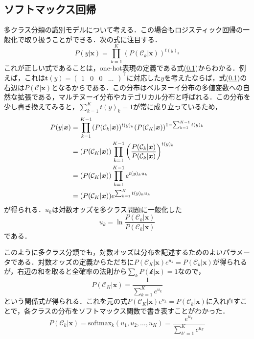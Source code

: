 \documentclass[a4paper,11pt]{jsreport}
\begin{document}
\subsection{ソフトマックス回帰}
多クラス分類の識別モデルについて考える．この場合もロジスティック回帰の一般化で取り扱うことができる．次の式に注目する．
\begin{equation}
  P(y | \bm{x}) 
  = \prod_{k=1}^{K} (P(\mathcal{C}_k | \bm{x}))^{t(y)_k}
\end{equation}
これが正しい式であることは，one-hot表現の定義である式(\ref{})からわかる．例えば，これは$\bm{t}(y) = \begin{pmatrix} 1 & 0 & 0 & \dots \end{pmatrix}^{\top}$に対応した$y$を考えたならば，式(\ref{})の右辺は$P(\mathcal{C} | \bm{x})$となるからである．この分布はベルヌーイ分布の多値変数への自然な拡張である，マルチヌーイ分布やカテゴリカル分布と呼ばれる．この分布を少し書き換えてみると，$\sum_{k=1}^{K} t(y)_k = 1$が常に成り立っているため，
\begin{align}
  P(y | \bm{x}) 
  &= \prod_{k=1}^{K-1} (P(\mathcal{C}_k | \bm{x}))^{t(y)_k} (P(\mathcal{C}_K | \bm{x}))^{1 - \sum_{k=1}^{K-1} t(y)_k} \notag \\
  &= (P(\mathcal{C}_K | \bm{x})) \prod_{k=1}^{K-1} \left( \frac{P(\mathcal{C}_k | \bm{x})}{P(\mathcal{C}_k | \bm{x})} \right)^{t(y)_k} \notag \\
  &= (P(\mathcal{C}_K | \bm{x})) \prod_{k=1}^{K-1} e^{t(y)_k u_k} \notag \\
  &= (P(\mathcal{C}_K | \bm{x})) e^{\sum_{k=1}^{K} t(y)_k u_k} 
\end{align}
が得られる．$u_k$は対数オッズを多クラス問題に一般化した
\begin{equation}
  u_k = \ln{\frac{P(\mathcal{C}_k | \bm{x})}{P(\mathcal{C}_k | \bm{x})}}
\end{equation}
である．\par
このように多クラス分類でも，対数オッズは分布を記述するためのよいパラメータである．対数オッズの定義からただちに$P(\mathcal{C}_K | \bm{x}) e^{u_k} = P(\mathcal{C}_k | \bm{x})$が得られるが，右辺の和を取ると全確率の法則から$\sum_{k} P(\mathcal{k} | \bm{x}) = 1$なので，
\begin{equation}
  P(\mathcal{C}_K | \bm{x})
  = \frac{1}{\sum_{k=1}^{K} e^{u_k}}
\end{equation}
という関係式が得られる．これを元の式$P(\mathcal{C}_K | \bm{x}) e^{u_k} = P(\mathcal{C}_k | \bm{x})$に入れ直すことで，各クラスの分布をソフトマックス関数で書き表すことがわかった．
\begin{equation}
  P(\mathcal{C}_k | \bm{x})
  = \text{softmax}_k (u_1, u_2, \dots, u_K) 
  = \frac{e^{u_k}}{\sum_{k'=1}^{K} e^{u_{k'}}}
\end{equation}
\end{document}
